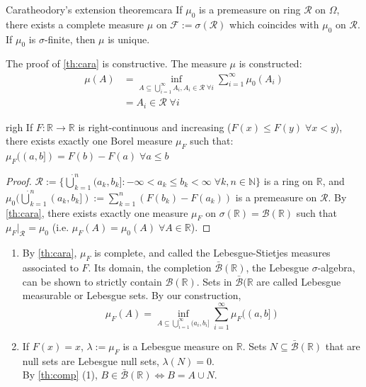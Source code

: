 \documentclass{article}
\begin{document}
	\begin{mythm}{Caratheodory's extension theorem}{cara}
		If $\mu_0$ is a premeasure on ring $\mathcal{R}$ on $\Omega$, there exists a complete measure $\mu$ on $\mathcal{F}:=\sigma(\mathcal{R})$ which coincides with $\mu_0$ on $\mathcal{R}$. If $\mu_0$ is $\sigma$-finite, then $\mu$ is unique.
	\end{mythm}
	
	\begin{myrem}{}{}
		The proof of \ref{th:cara} is constructive. The measure $\mu$ is constructed:
		\begin{align*}
			\mu(A)&=\inf_{A\subseteq\bigcup_{i=1}^{\infty}A_i, A_i\in\mathcal{R}\;\forall i}\sum_{i=1}^{\infty}\mu_0(A_i)\\
			&=A_i\in\mathcal{R}\;\forall i
		\end{align*}
	\end{myrem}
	
	\begin{mythm}{}{righ}
		If $F : \mathbb{R}\to\mathbb{R}$ is right-continuous and increasing ($F(x)\leq F(y)\;\forall x<y$), there exists exactly one Borel measure $\mu_F$ such that:\\
		
		$\mu_F((a, b])=F(b)-F(a)\;\forall a\leq b$
		
		\begin{proof}
			$\mathcal{R}:=\{\dot\bigcup_{k=1}^{n}(a_k, b_k] : -\infty<a_k\leq b_k<\infty\;\forall k, n\in\mathbb{N}\}$ is a ring on $\mathbb{R}$, and $\mu_0(\dot\bigcup_{k=1}^{n}(a_k, b_k]):=\sum_{k=1}^{n}(F(b_k)-F(a_k))$ is a premeasure on $\mathcal{R}$. By \ref{th:cara}, there exists exactly one measure $\mu_F$ on $\sigma(\mathbb{R})=\mathcal{B}(\mathbb{R})$ such that $\mu_F|_{\mathcal{R}}=\mu_0$ (i.e. $\mu_F(A)=\mu_0(A)\;\forall A\in\mathbb{R}$).
		\end{proof}
	\end{mythm}
	
	\begin{myrem}{}{}
		\begin{enumerate}
			\item By \ref{th:cara}, $\mu_F$ is complete, and called the Lebesgue-Stietjes measures associated to $F$. Its domain, the completion $\bar{\mathcal{B}}(\mathbb{R})$, the Lebesgue $\sigma$-algebra, can be shown to strictly contain $\mathcal{B}(\mathbb{R})$. Sets in $\bar{\mathcal{B}}(\mathbb{R}$ are called Lebesgue measurable or Lebesgue sets. By our construction,
			\begin{equation*}
				\mu_F(A)=\inf_{A\subseteq\bigcup_{i=1}^{\infty}(a_i, b_i]}\sum_{i=1}^{\infty}\mu_F((a, b])
			\end{equation*}
			\item If $F(x)=x$, $\lambda:=\mu_F$ is a Lebesgue measure on $\mathbb{R}$. Sets $N\subseteq\bar{\mathcal{B}}(\mathbb{R})$ that are null sets are Lebesgue null sets, $\lambda(N)=0$.\\
			
			By \ref{th:comp} (1), $B\in\bar{\mathcal{B}}(\mathbb{R})\Leftrightarrow B=A\cup N$.
		\end{enumerate}
	\end{myrem}
	
\end{document}
